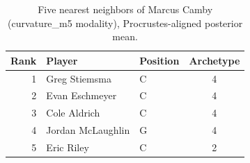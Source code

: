 \begin{table}[htbp]
  \centering\small
  \begin{tabular}{rllc}
    \toprule
    Rank & Player & Position & Archetype \\
    \midrule
    1 & Greg Stiemsma & C & 4 \\
    2 & Evan Eschmeyer & C & 4 \\
    3 & Cole Aldrich & C & 4 \\
    4 & Jordan McLaughlin & G & 4 \\
    5 & Eric Riley & C & 2 \\
    \bottomrule
  \end{tabular}
  \caption{Five nearest neighbors of Marcus Camby (curvature_m5 modality), Procrustes-aligned posterior mean.}
  \label{tab:Marcus_Camby_neighbors_curvature_m5}
\end{table}

